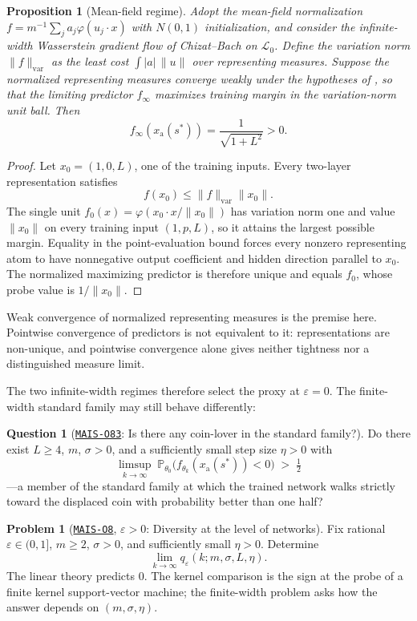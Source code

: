 \documentclass[11pt]{amsart}
\newcommand{\Oid}[1]{\href{https://github.com/lionellevine/MAIS/blob/main/open-problems/MAIS-O#1.md}{\texttt{MAIS-O#1}}}
\theoremstyle{plain}
\newtheorem{proposition}[theorem]{Proposition}
\theoremstyle{definition}
\newtheorem{problem}[theorem]{Problem}
\newtheorem{question}[theorem]{Question}
\begin{document}
\begin{proposition}[Mean-field regime]\label{prop:meanfield}
Adopt the mean-field normalization $f=m^{-1}\sum_j a_j\varphi(u_j\cdot x)$ with $N(0,1)$ initialization, and consider the infinite-width Wasserstein gradient flow of Chizat--Bach \cite{chizat2020} on $\mathcal L_0$. Define the \emph{variation norm} $\|f\|_{\mathrm{var}}$ as the least cost $\int|a|\,\|u\|$ over representing measures. Suppose the normalized representing measures converge weakly under the hypotheses of \cite{chizat2020}, so that the limiting predictor $f_\infty$ maximizes training margin in the variation-norm unit ball. Then
\[
f_\infty(x_{\mathrm a}(s^*))=\frac1{\sqrt{1+L^2}}>0.
\]
\end{proposition}

\begin{proof}
Let $x_0=(1,0,L)$, one of the training inputs. Every two-layer representation satisfies
\[
f(x_0)\le\|f\|_{\mathrm{var}}\|x_0\|.
\]
The single unit $f_0(x)=\varphi(x_0\cdot x/\|x_0\|)$ has variation norm one and value $\|x_0\|$ on every training input $(1,p,L)$, so it attains the largest possible margin. Equality in the point-evaluation bound forces every nonzero representing atom to have nonnegative output coefficient and hidden direction parallel to $x_0$. The normalized maximizing predictor is therefore unique and equals $f_0$, whose probe value is $1/\|x_0\|$.
\end{proof}

Weak convergence of normalized representing measures is the premise here. Pointwise convergence of predictors is not equivalent to it: representations are non-unique, and pointwise convergence alone gives neither tightness nor a distinguished measure limit.

The two infinite-width regimes therefore select the proxy at $\varepsilon=0$. The finite-width standard family may still behave differently:

\begin{question}[\Oid{83}: Is there any coin-lover in the standard family?]\label{q:coinlover}
Do there exist $L\ge4$, $m$, $\sigma>0$, and a sufficiently small step size $\eta>0$ with
\[
   \limsup_{k\to\infty}\;\mathbb P_{\theta_0}\bigl(f_{\theta_k}(x_{\mathrm a}(s^{*}))<0\bigr)\;>\;\tfrac12
\]
---a member of the standard family at which the trained network walks strictly toward the displaced coin with probability better than one half?
\end{question}

\begin{problem}[\Oid{8}, $\varepsilon>0$: Diversity at the level of networks]\label{prob:diversitynets}
Fix rational $\varepsilon\in(0,1]$, $m\ge2$, $\sigma>0$, and sufficiently small $\eta>0$. Determine
\[
\lim_{k\to\infty}q_\varepsilon(k;m,\sigma,L,\eta).
\]
The linear theory predicts $0$. The kernel comparison is the sign at the probe of a finite kernel support-vector machine; the finite-width problem asks how the answer depends on $(m,\sigma,\eta)$.
\end{problem}
\end{document}
